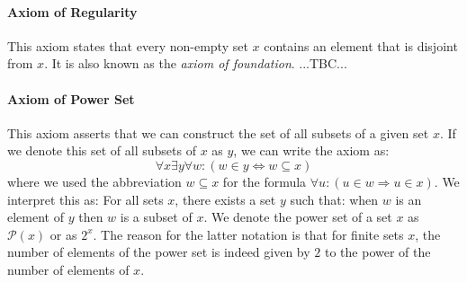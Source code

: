 
\paragraph{Axiom of Regularity}
This axiom states that every non-empty set $x$ contains an element that is disjoint from $x$. It is also known as the \emph{axiom of foundation}. ...TBC...







% 

\paragraph{Axiom of Power Set}
This axiom asserts that we can construct the set of all subsets of a given set $x$. If we denote this set of all subsets of $x$ as $y$, we can write the axiom as:
\begin{equation}
\forall x \exists y \forall w: (w \in y \Leftrightarrow w \subseteq x)
\end{equation}
where we used the abbreviation $w \subseteq x$ for the formula $\forall u: (u \in w \Rightarrow u \in x)$. We interpret this as: For all sets $x$, there exists a set $y$ such that: when $w$ is an element of $y$ then $w$ is a subset of $x$. We denote the power set of a set $x$ as $\mathcal{P}(x)$ or as $2^x$. The reason for the latter notation is that for finite sets $x$, the number of elements of the power set is indeed given by $2$ to the power of the number of elements of $x$.

